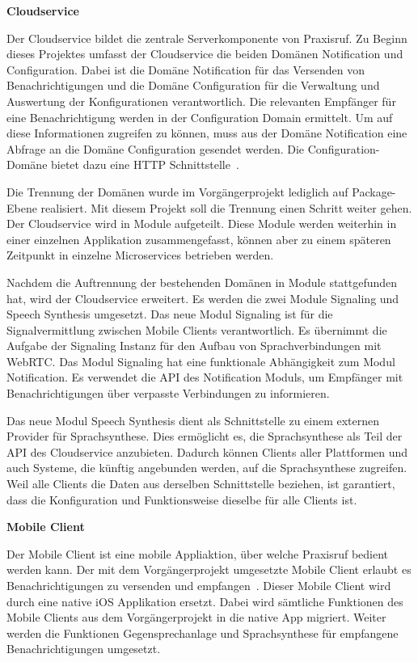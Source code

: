 \textbf{Cloudservice}

Der Cloudservice bildet die zentrale Serverkomponente von Praxisruf.
Zu Beginn dieses Projektes umfasst der Cloudservice die beiden Domänen Notification und Configuration.
Dabei ist die Domäne Notification für das Versenden von Benachrichtigungen und die Domäne Configuration für die Verwaltung und Auswertung der Konfigurationen verantwortlich.
Die relevanten Empfänger für eine Benachrichtigung werden in der Configuration Domain ermittelt.
Um auf diese Informationen zugreifen zu können, muss aus der Domäne Notification eine Abfrage an die Domäne Configuration gesendet werden.
Die Configuration-Domäne bietet dazu eine HTTP Schnittstelle~\cite{ip5}.

Die Trennung der Domänen wurde im Vorgängerprojekt lediglich auf Package-Ebene realisiert.
Mit diesem Projekt soll die Trennung einen Schritt weiter gehen.
Der Cloudservice wird in Module aufgeteilt.
Diese Module werden weiterhin in einer einzelnen Applikation zusammengefasst, können aber zu einem späteren Zeitpunkt in einzelne Microservices betrieben werden.

Nachdem die Auftrennung der bestehenden Domänen in Module stattgefunden hat, wird der Cloudservice erweitert.
Es werden die zwei Module Signaling und Speech Synthesis umgesetzt.
Das neue Modul Signaling ist für die Signalvermittlung zwischen Mobile Clients verantwortlich.
Es übernimmt die Aufgabe der Signaling Instanz für den Aufbau von Sprachverbindungen mit WebRTC.
Das Modul Signaling hat eine funktionale Abhängigkeit zum Modul Notification.
Es verwendet die API des Notification Moduls, um Empfänger mit Benachrichtigungen über verpasste Verbindungen zu informieren.

Das neue Modul Speech Synthesis dient als Schnittstelle zu einem externen Provider für Sprachsynthese.
Dies ermöglicht es, die Sprachsynthese als Teil der API des Cloudservice anzubieten.
Dadurch können Clients aller Plattformen und auch Systeme, die künftig angebunden werden, auf die Sprachsynthese zugreifen.
Weil alle Clients die Daten aus derselben Schnittstelle beziehen, ist garantiert, dass die Konfiguration und Funktionsweise dieselbe für alle Clients ist.

\textbf{Mobile Client}

Der Mobile Client ist eine mobile Appliaktion, über welche Praxisruf bedient werden kann.
Der mit dem Vorgängerprojekt umgesetzte Mobile Client erlaubt es Benachrichtigungen zu versenden und empfangen~\cite{ip5}.
Dieser Mobile Client wird durch eine native iOS Applikation ersetzt.
Dabei wird sämtliche Funktionen des Mobile Clients aus dem Vorgängerprojekt in die native App migriert.
Weiter werden die Funktionen Gegensprechanlage und Sprachsynthese für empfangene Benachrichtigungen umgesetzt.

